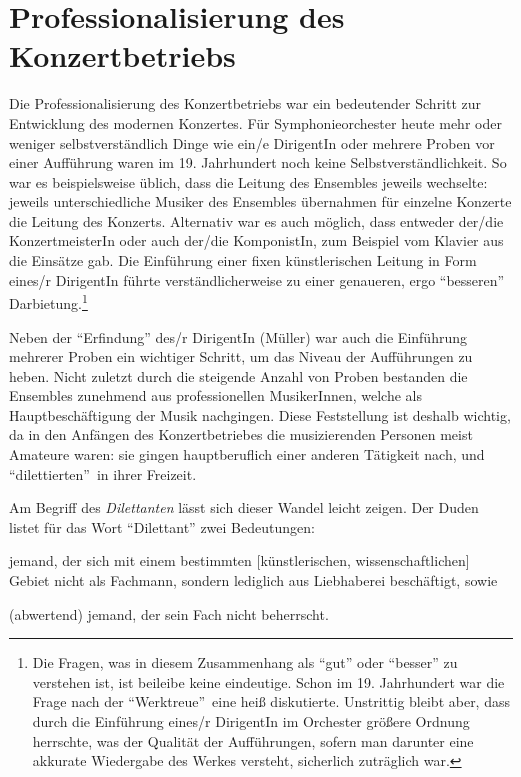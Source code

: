 \documentclass[a4paper, german, oneside]{scrbook}
\begin{document}
\section{Professionalisierung des Konzertbetriebs}
\label{professionalisierung}
Die Professionalisierung des Konzertbetriebs war ein bedeutender Schritt zur Entwicklung des modernen Konzertes. Für Symphonieorchester heute mehr oder weniger selbstverständlich Dinge wie ein/e DirigentIn oder mehrere Proben vor einer Aufführung waren im 19. Jahrhundert noch keine Selbstverständlichkeit. So war es beispielsweise üblich, dass die Leitung des Ensembles jeweils wechselte: jeweils unterschiedliche Musiker des Ensembles übernahmen für einzelne Konzerte die Leitung des Konzerts. \parencite[vgl.][68]{weber_music_2004} Alternativ war es auch möglich, dass entweder der/die KonzertmeisterIn oder auch der/die KomponistIn, zum Beispiel vom Klavier aus die Einsätze gab. Die Einführung einer fixen künstlerischen Leitung in Form eines/r DirigentIn führte verständlicherweise zu einer genaueren, ergo \enquote{besseren} Darbietung.\footnote{Die Fragen, was in diesem Zusammenhang als \enquote{gut} oder \enquote{besser} zu verstehen ist, ist beileibe keine eindeutige. Schon im 19. Jahrhundert war die Frage nach der \enquote{Werktreue} eine heiß diskutierte. Unstrittig bleibt aber, dass durch die Einführung eines/r DirigentIn im Orchester größere Ordnung herrschte, was der Qualität der Aufführungen, sofern man darunter eine akkurate Wiedergabe des Werkes versteht, sicherlich zuträglich war.}

Neben der \enquote{Erfindung} des/r DirigentIn (Müller) war auch die Einführung mehrerer Proben ein wichtiger Schritt, um das Niveau der Aufführungen zu heben. Nicht zuletzt durch die steigende Anzahl von Proben bestanden die Ensembles zunehmend aus professionellen MusikerInnen, welche als Hauptbeschäftigung der Musik nachgingen. Diese Feststellung ist deshalb wichtig, da in den Anfängen des Konzertbetriebes die musizierenden Personen meist Amateure waren: sie gingen hauptberuflich einer anderen Tätigkeit nach, und \enquote{dilettierten} in ihrer Freizeit.

Am Begriff des \emph{Dilettanten} lässt sich dieser Wandel leicht zeigen. Der Duden listet für das Wort \enquote{Dilettant} zwei Bedeutungen:
\begin{inparaenum}[(a)]
	\item jemand, der sich mit einem bestimmten [künstlerischen, wissenschaftlichen] Gebiet nicht als Fachmann, sondern lediglich aus Liebhaberei beschäftigt, sowie
	\item (abwertend) jemand, der sein Fach nicht beherrscht.
\end{inparaenum}
\parencite{Dilettant}
\end{document}
